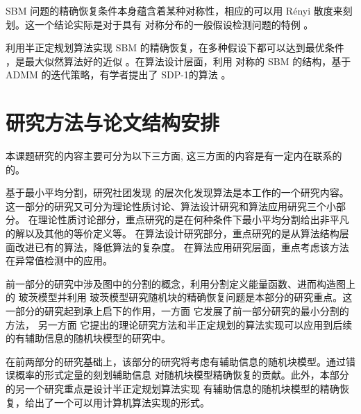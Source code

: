 SBM 问题的精确恢复条件本身蕴含着某种对称性，相应的可以用 Rényi 散度来刻划。这一个结论实际是对于具有
对称分布的一般假设检测问题的特例 \cite{gao2018community}。

利用半正定规划算法实现 SBM 的精确恢复，在多种假设下都可以达到最优条件 \cite{hajek2016achieving}，是最大似然算法好的近似 。在算法设计层面，利用 对称的 SBM 的结构，基于 ADMM 的迭代策略，有学者提出了 SDP-1的算法 \cite{amini2018semidefinite}。

\section{研究方法与论文结构安排}
本课题研究的内容主要可分为以下三方面, 这三方面的内容是有一定内在联系的
的。

基于最小平均分割，研究社团发现
的层次化发现算法是本工作的一个研究内容。这一部分的研究又可分为理论性质讨论、算法设计研究和算法应用研究三个小部分。
在理论性质讨论部分，重点研究的是在何种条件下最小平均分割给出非平凡的解以及其他的等价定义等。
在算法设计研究部分，重点研究的是从算法结构层面改进已有的算法，降低算法的复杂度。
在算法应用研究层面，重点考虑该方法在异常值检测中的应用。
 
前一部分的研究中涉及图中的分割的概念，利用分割定义能量函数、进而构造图上的 玻茨模型并利用
玻茨模型研究随机块的精确恢复问题是本部分的研究重点。这一部分的研究起到承上启下的作用，一方面
它发展了前一部分研究的最小分割的方法，
另一方面
它提出的理论研究方法和半正定规划的算法实现可以应用到后续的有辅助信息的随机块模型的研究中。

在前两部分的研究基础上，该部分的研究将考虑有辅助信息的随机块模型。通过错误概率的形式定量的刻划辅助信息
对随机块模型精确恢复的贡献。此外，本部分的另一个研究重点是设计半正定规划算法实现
有辅助信息的随机块模型的精确恢复，给出了一个可以用计算机算法实现的形式。
